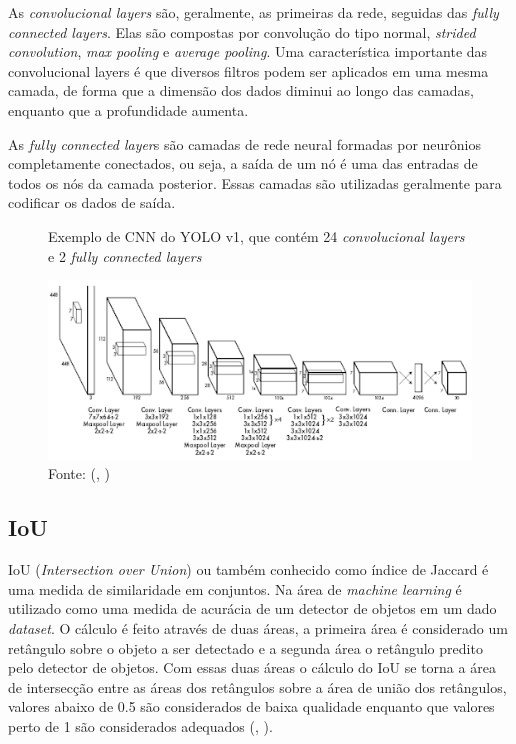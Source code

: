 \documentclass[]{politex}
\begin{document}
As \textit{convolucional layers} são, geralmente, as primeiras da rede, seguidas das \textit{fully connected layers}. Elas são compostas por convolução do tipo normal, \textit{strided convolution}, \textit{max pooling} e \textit{average pooling}. Uma característica importante das convolucional layers é que diversos filtros podem ser aplicados em uma mesma camada, de forma que a dimensão dos dados diminui ao longo das camadas, enquanto que a profundidade aumenta.

As \textit{fully connected layer}s são camadas de rede neural formadas por neurônios completamente conectados, ou seja, a saída de um nó é uma das entradas de todos os nós da camada posterior. Essas camadas são utilizadas geralmente para codificar os dados de saída.

\begin{figure}[H]
    \centering
    \caption{Exemplo de CNN do YOLO v1, que contém 24 \textit{convolucional layers} e 2 \textit{fully connected layers}}
    \includegraphics[width=\textwidth]{arquitetura_yolo}
    \caption*{Fonte: (, \citeyear{yolov1})}
    \label{fig:arq_yolo}
\end{figure}

\subsection{IoU}
IoU (\textit{Intersection over Union}) ou também conhecido como índice de Jaccard é uma medida de similaridade em conjuntos. Na área de \textit{machine learning} é utilizado como uma medida de acurácia de um detector de objetos em um dado \textit{dataset}. O cálculo é feito através de duas áreas, a primeira área é considerado um retângulo sobre o objeto a ser detectado e a segunda área o retângulo predito pelo detector de objetos. Com essas duas áreas o cálculo do IoU se torna a área de intersecção entre as áreas dos retângulos sobre a área de união dos retângulos, valores abaixo de 0.5 são considerados de baixa qualidade enquanto que valores perto de 1 são considerados adequados (, \citeyear{iou}).
\end{document}
